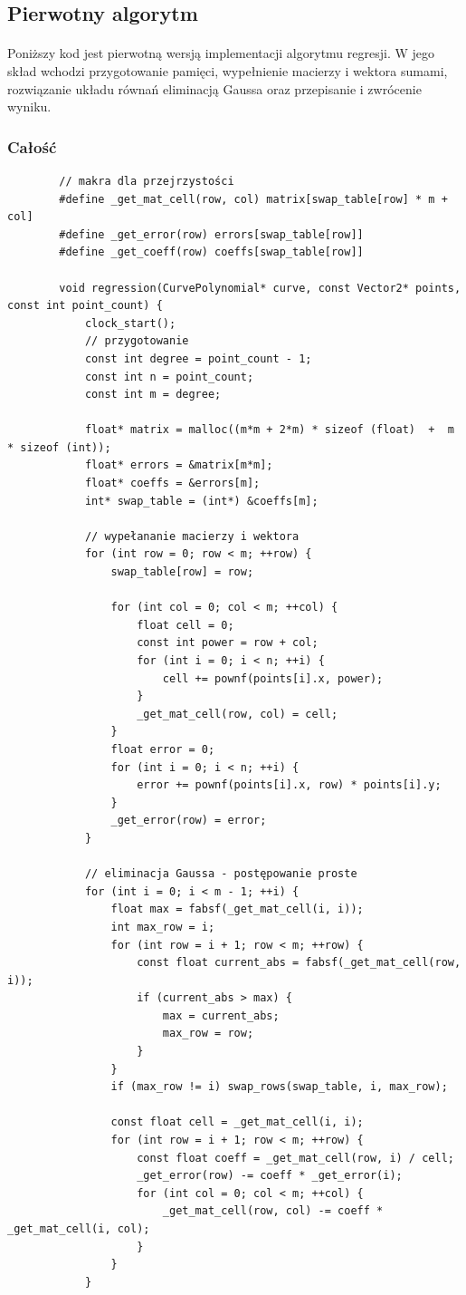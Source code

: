 \documentclass[12pt]{report}
\begin{document}
	
	\subsection{Pierwotny algorytm}
	\paragraph{}
	Poniższy kod jest pierwotną wersją implementacji algorytmu regresji. W jego skład wchodzi przygotowanie pamięci, wypełnienie macierzy i wektora sumami, rozwiązanie układu równań eliminacją Gaussa oraz przepisanie i zwrócenie wyniku.
	\subsubsection{Całość}
	\begin{verbatim}
		// makra dla przejrzystości
		#define _get_mat_cell(row, col) matrix[swap_table[row] * m + col]
		#define _get_error(row) errors[swap_table[row]]
		#define _get_coeff(row) coeffs[swap_table[row]]
		
		void regression(CurvePolynomial* curve, const Vector2* points, const int point_count) {
			clock_start();
			// przygotowanie
			const int degree = point_count - 1;
			const int n = point_count;
			const int m = degree;
			
			float* matrix = malloc((m*m + 2*m) * sizeof (float)  +  m * sizeof (int));
			float* errors = &matrix[m*m];
			float* coeffs = &errors[m];
			int* swap_table = (int*) &coeffs[m];
			
			// wypełananie macierzy i wektora
			for (int row = 0; row < m; ++row) {
				swap_table[row] = row;
				
				for (int col = 0; col < m; ++col) {
					float cell = 0;
					const int power = row + col;
					for (int i = 0; i < n; ++i) {
						cell += pownf(points[i].x, power);
					}
					_get_mat_cell(row, col) = cell;
				}
				float error = 0;
				for (int i = 0; i < n; ++i) {
					error += pownf(points[i].x, row) * points[i].y;
				}
				_get_error(row) = error;
			}
			
			// eliminacja Gaussa - postępowanie proste
			for (int i = 0; i < m - 1; ++i) {
				float max = fabsf(_get_mat_cell(i, i));
				int max_row = i;
				for (int row = i + 1; row < m; ++row) {
					const float current_abs = fabsf(_get_mat_cell(row, i));
					if (current_abs > max) {
						max = current_abs;
						max_row = row;
					}
				}
				if (max_row != i) swap_rows(swap_table, i, max_row);
				
				const float cell = _get_mat_cell(i, i);
				for (int row = i + 1; row < m; ++row) {
					const float coeff = _get_mat_cell(row, i) / cell;
					_get_error(row) -= coeff * _get_error(i);
					for (int col = 0; col < m; ++col) {
						_get_mat_cell(row, col) -= coeff * _get_mat_cell(i, col);
					}
				}
			}
			

\end{verbatim}
\end{document}
